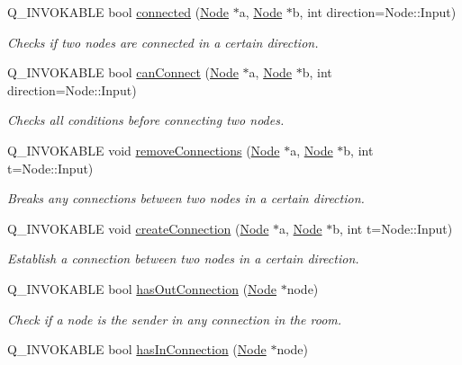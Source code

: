 \begin{DoxyCompactItemize}
Q\+\_\+\+I\+N\+V\+O\+K\+A\+B\+LE bool \mbox{\hyperlink{classRoom_aaaeb040b9fa13894f4c19fb1eecbefd2}{connected}} (\mbox{\hyperlink{classNode}{Node}} $\ast$a, \mbox{\hyperlink{classNode}{Node}} $\ast$b, int direction=Node\+::\+Input)
\begin{DoxyCompactList}\small\item\em Checks if two nodes are connected in a certain direction. \end{DoxyCompactList}\item 
Q\+\_\+\+I\+N\+V\+O\+K\+A\+B\+LE bool \mbox{\hyperlink{classRoom_a085e1c1c95f6d30dded1ace857a3ec09}{can\+Connect}} (\mbox{\hyperlink{classNode}{Node}} $\ast$a, \mbox{\hyperlink{classNode}{Node}} $\ast$b, int direction=Node\+::\+Input)
\begin{DoxyCompactList}\small\item\em Checks all conditions before connecting two nodes. \end{DoxyCompactList}\item 
Q\+\_\+\+I\+N\+V\+O\+K\+A\+B\+LE void \mbox{\hyperlink{classRoom_a0b0b13f4ebd1c45353090b6ac64ed433}{remove\+Connections}} (\mbox{\hyperlink{classNode}{Node}} $\ast$a, \mbox{\hyperlink{classNode}{Node}} $\ast$b, int t=Node\+::\+Input)
\begin{DoxyCompactList}\small\item\em Breaks any connections between two nodes in a certain direction. \end{DoxyCompactList}\item 
Q\+\_\+\+I\+N\+V\+O\+K\+A\+B\+LE void \mbox{\hyperlink{classRoom_a3a88ea31e062677f1d245960b20a6e97}{create\+Connection}} (\mbox{\hyperlink{classNode}{Node}} $\ast$a, \mbox{\hyperlink{classNode}{Node}} $\ast$b, int t=Node\+::\+Input)
\begin{DoxyCompactList}\small\item\em Establish a connection between two nodes in a certain direction. \end{DoxyCompactList}\item 
Q\+\_\+\+I\+N\+V\+O\+K\+A\+B\+LE bool \mbox{\hyperlink{classRoom_ad942f0c7132818f36a4de16fe2ca477a}{has\+Out\+Connection}} (\mbox{\hyperlink{classNode}{Node}} $\ast$node)
\begin{DoxyCompactList}\small\item\em Check if a node is the sender in any connection in the room. \end{DoxyCompactList}\item 
Q\+\_\+\+I\+N\+V\+O\+K\+A\+B\+LE bool \mbox{\hyperlink{classRoom_aeffeac1d449a9a713efcf94efb2432e0}{has\+In\+Connection}} (\mbox{\hyperlink{classNode}{Node}} $\ast$node)

\end{DoxyCompactItemize}
